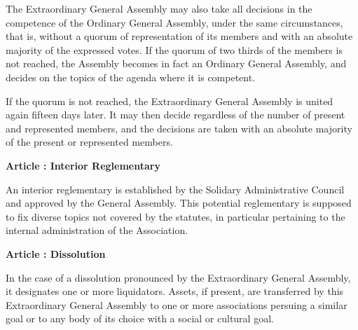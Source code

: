 \documentclass [11pt]{article}
\renewcommand {\section}[1]{\stepcounter {section}%
{\vspace {1em}\noindent\Large \bf Article \thesection: #1 \par}}
\begin{document}
The Extraordinary General Assembly may also take all decisions in the
competence of the Ordinary General Assembly, under the same circumstances,
that is, without a quorum of representation of its members and with
an absolute majority of the expressed votes. If the quorum of two thirds
of the members is not reached, the Assembly becomes in fact an Ordinary
General Assembly, and decides on the topics of the agenda where it
is competent.

If the quorum is not reached, the Extraordinary General Assembly is
united again fifteen days later. It may then decide regardless
of the number of present and represented members, and the decisions are
taken with an absolute majority of the present or represented members.


\section {Interior Reglementary}

An interior reglementary is established by the Solidary Administrative
Council and approved by the General Assembly. This potential reglementary
is supposed to fix diverse topics not covered by the statutes, in
particular pertaining to the internal administration of the Association.


\section {Dissolution}

In the case of a dissolution pronounced by the Extraordinary General
Assembly, it designates one or more liquidators. Assets, if present,
are transferred by this Extraordinary General Assembly to one or more
associations persuing a similar goal or to any body of its choice
with a social or cultural goal.
\end{document}
